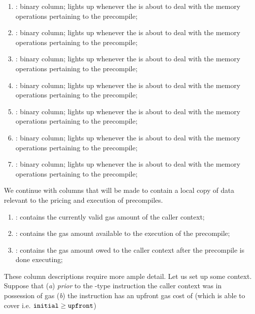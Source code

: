 \begin{enumerate}[resume]
	\item \scenBlsGOneMsm:        binary column; lights up whenever the \zkEvm{} is about to deal with the memory operations pertaining to the \instBlsGOneMsm{}         precompile;
	\item \scenBlsGTwoAdd:        binary column; lights up whenever the \zkEvm{} is about to deal with the memory operations pertaining to the \instBlsGTwoAdd{}         precompile;
	\item \scenBlsGTwoMsm:        binary column; lights up whenever the \zkEvm{} is about to deal with the memory operations pertaining to the \instBlsGTwoMsm{}         precompile;
	\item \scenBlsPairingCheck:   binary column; lights up whenever the \zkEvm{} is about to deal with the memory operations pertaining to the \instBlsPairingCheck{}    precompile;
	\item \scenBlsMapFpToGOne:    binary column; lights up whenever the \zkEvm{} is about to deal with the memory operations pertaining to the \instBlsMapFpToGOne{}     precompile;
	\item \scenBlsMapFpTwoToGTwo: binary column; lights up whenever the \zkEvm{} is about to deal with the memory operations pertaining to the \instBlsMapFpTwoToGTwo{}  precompile;
	\item \scenPVerify:           binary column; lights up whenever the \zkEvm{} is about to deal with the memory operations pertaining to the \instPVerify{}            precompile;
\end{enumerate}
We continue with columns that will be made to contain a local copy of data relevant to the pricing and execution of precompiles.
\begin{enumerate}[resume]
	\item \scenPrcCurrentlyValidCallerGas:
		contains the currently valid gas amount of the caller context; 
	\item \scenPrcGasAllowance:
		contains the gas amount available to the execution of the precompile;
	\item \scenPrcGasOwedToCaller:
		contains the gas amount owed to the caller context after the precompile is done executing; 
\end{enumerate}
These column descriptions require more ample detail.
Let us set up some context.
Suppose that
(\emph{a}) \emph{prior} to the -type instruction the caller context was in possession of \hereInitial{} gas
(\emph{b}) the instruction has an upfront gas cost of \hereUpfront{} (which \hereInitial{} is able to cover i.e. $\texttt{initial} \geq \texttt{upfront}$)
